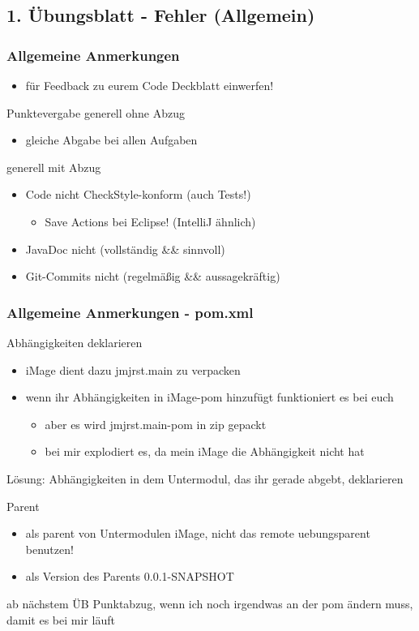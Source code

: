 \documentclass[18pt]{beamer}
\begin{document}
	\subsection{1. Übungsblatt - Fehler (Allgemein)}
	\begin{frame}
		\frametitle{Allgemeine Anmerkungen}
			\begin{itemize}
			\item für Feedback zu eurem Code Deckblatt einwerfen!
		\end{itemize}
		\begin{block}{Punktevergabe}
			generell ohne Abzug
			\begin{itemize}
				\item gleiche Abgabe bei allen Aufgaben
			\end{itemize}
			\pause
			generell mit Abzug
			\begin{itemize}
				\item Code nicht CheckStyle-konform (auch Tests!) 
				\begin{itemize}
					\item Save Actions bei Eclipse! (IntelliJ ähnlich)
				\end{itemize}
				\item JavaDoc nicht (vollständig \&\& sinnvoll)
				\item Git-Commits nicht (regelmäßig \&\& aussagekräftig)
			\end{itemize}
		\end{block}
	\end{frame}

\begin{frame}
\frametitle{Allgemeine Anmerkungen - pom.xml}

\begin{block}{Abhängigkeiten deklarieren}
\begin{itemize}
		\item iMage dient dazu jmjrst.main zu verpacken
		\item wenn ihr Abhängigkeiten in iMage-pom hinzufügt funktioniert es bei euch
		\begin{itemize}
			\item aber es wird jmjrst.main-pom in zip gepackt
			\item bei mir explodiert es, da mein iMage die Abhängigkeit nicht hat
		\end{itemize}
	\end{itemize}
 Lösung: Abhängigkeiten in dem Untermodul, das ihr gerade abgebt, deklarieren
\end{block}
\pause
\begin{block}{Parent}
	\begin{itemize}
		\item als parent von Untermodulen iMage, nicht das remote uebungsparent benutzen!
		\item als Version des Parents 0.0.1-SNAPSHOT
	\end{itemize}
\end{block}
\pause
ab nächstem ÜB Punktabzug, wenn ich noch irgendwas an der pom ändern muss, damit es bei mir läuft 
\end{frame}
	
\end{document}

